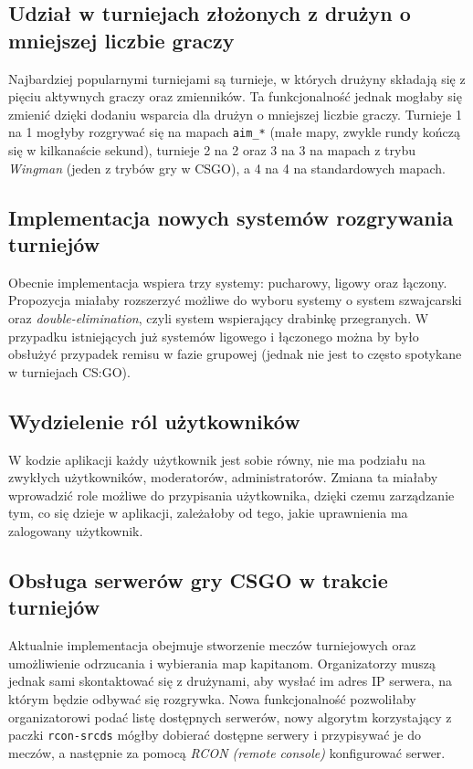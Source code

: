 \documentclass[shortabstract]{iithesis}
\theoremstyle{definition} \newtheorem{definition}{Definicja}[]
\theoremstyle{remark} \newtheorem{remark}[definition]{Observation}
\theoremstyle{plain} \newtheorem{theorem}[definition]{Theorem}
\theoremstyle{plain} \newtheorem{lemma}[definition]{Lemma}
\begin{document}
\subsection{Udział w turniejach złożonych z drużyn o mniejszej liczbie graczy}
Najbardziej popularnymi turniejami są turnieje, w których drużyny składają się z pięciu aktywnych graczy oraz zmienników. Ta funkcjonalność jednak mogłaby się zmienić dzięki dodaniu wsparcia dla drużyn o mniejszej liczbie graczy. Turnieje 1 na 1 mogłyby rozgrywać się na mapach \texttt{aim\_*} (małe mapy, zwykle rundy kończą się w kilkanaście sekund), turnieje 2 na 2 oraz 3 na 3 na mapach z trybu \textit{Wingman} (jeden z trybów gry w CSGO), a 4 na 4 na standardowych mapach.

\subsection{Implementacja nowych systemów rozgrywania turniejów}
Obecnie implementacja wspiera trzy systemy: pucharowy, ligowy oraz łączony. Propozycja miałaby rozszerzyć możliwe do wyboru systemy o system szwajcarski oraz \textit{double-elimination}, czyli system wspierający drabinkę przegranych. W przypadku istniejących już systemów ligowego i łączonego można by było obsłużyć przypadek remisu w fazie grupowej (jednak nie jest to często spotykane w turniejach CS:GO).

\subsection{Wydzielenie ról użytkowników}
W kodzie aplikacji każdy użytkownik jest sobie równy, nie ma podziału na zwykłych użytkowników, moderatorów, administratorów. Zmiana ta miałaby wprowadzić role możliwe do przypisania użytkownika, dzięki czemu zarządzanie tym, co się dzieje w aplikacji, zależałoby od tego, jakie uprawnienia ma zalogowany użytkownik.

\subsection{Obsługa serwerów gry CSGO w trakcie turniejów}
Aktualnie implementacja obejmuje stworzenie meczów turniejowych oraz umożliwienie odrzucania i wybierania map kapitanom. Organizatorzy muszą jednak sami skontaktować się z drużynami, aby wysłać im adres IP serwera, na którym będzie odbywać się rozgrywka. Nowa funkcjonalność pozwoliłaby organizatorowi podać listę dostępnych serwerów, nowy algorytm korzystający z paczki \texttt{rcon-srcds} \cite{bib:rcon-lib} mógłby dobierać dostępne serwery i przypisywać je do meczów, a następnie za pomocą \textit{RCON (remote console)} konfigurować serwer.
\end{document}

